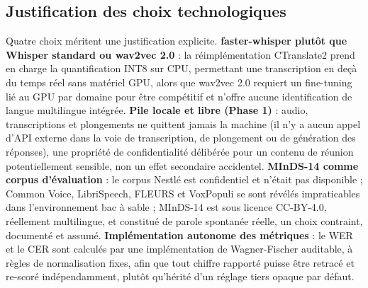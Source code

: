\documentclass[12pt]{report}
\begin{document}
\subsection{Justification des choix technologiques}
Quatre choix méritent une justification explicite. \textbf{faster-whisper plutôt que Whisper standard ou wav2vec 2.0} : la réimplémentation CTranslate2 prend en charge la quantification INT8 sur CPU, permettant une transcription en deçà du temps réel sans matériel GPU, alors que wav2vec 2.0 requiert un fine-tuning lié au GPU par domaine pour être compétitif et n'offre aucune identification de langue multilingue intégrée. \textbf{Pile locale et libre (Phase 1)} : audio, transcriptions et plongements ne quittent jamais la machine (il n'y a aucun appel d'API externe dans la voie de transcription, de plongement ou de génération des réponses), une propriété de confidentialité délibérée pour un contenu de réunion potentiellement sensible, non un effet secondaire accidentel. \textbf{MInDS-14 comme corpus d'évaluation} : le corpus Nestl\'e est confidentiel et n'était pas disponible ; Common Voice, LibriSpeech, FLEURS et VoxPopuli se sont révélés impraticables dans l'environnement bac à sable ; MInDS-14 est sous licence CC-BY-4.0, réellement multilingue, et constitué de parole spontanée réelle, un choix contraint, documenté et assumé. \textbf{Implémentation autonome des métriques} : le WER et le CER sont calculés par une implémentation de Wagner-Fischer auditable, à règles de normalisation fixes, afin que tout chiffre rapporté puisse être retracé et re-scoré indépendamment, plutôt qu'hérité d'un réglage tiers opaque par défaut.
\end{document}
